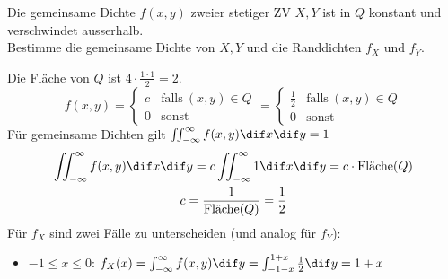 \begin{example}
	\begin{center}
		\begin{minipage}{0.65\linewidth}
			Die gemeinsame Dichte $f(x,y)$ zweier stetiger ZV $X,Y$ ist in $Q$ konstant und verschwindet ausserhalb.\\
			Bestimme die gemeinsame Dichte von $X,Y$ und die Randdichten $f_X$ und $f_Y$.
		\end{minipage}
		\begin{minipage}{0.3\linewidth}
			\begin{center}
			\end{center}
		\end{minipage}
	\end{center}
	\tcblower
	Die Fläche von $Q$ ist $4 \cdot \frac{1 \cdot 1}{2} = 2$.
	\begin{equation*}
		f(x,y) =
		\begin{cases}
			c & \text{falls} ~(x,y) \in Q\\
			0 & \text{sonst}
		\end{cases}
		=
		\begin{cases}
			\frac{1}{2} & \text{falls} ~(x,y) \in Q\\
			0 & \text{sonst}
		\end{cases}
	\end{equation*}
	Für gemeinsame Dichten gilt $\iint_{-\infty}^\infty f(x,y) \dif x \dif y = 1$
	\begin{gather*}
		\iint_{-\infty}^\infty f(x,y) \dif x \dif y = c \iint_{-\infty}^\infty 1 \dif x \dif y = c \cdot \text{Fläche}(Q)
		\\
		c = \frac{1}{\text{Fläche}(Q)} = \frac{1}{2} 
	\end{gather*}
	Für $f_X$ sind zwei Fälle zu unterscheiden (und analog für $f_Y$):
	\begin{itemize}
		\item $-1 \leq x \leq 0$: $f_X(x) = \int_{-\infty}^{\infty} f(x,y) \dif y = \int_{-1-x}^{1+x} \frac{1}{2} \dif y = 1 + x$

\end{itemize}
\end{example}
